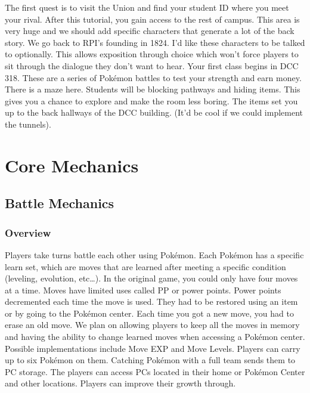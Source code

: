 \documentclass[11pt,fleqn]{book} %
\begin{document}
\indent The first quest is to visit the Union and find your student ID where you meet your rival. After this tutorial, you gain access to the rest of campus. This area is very huge and we should add specific characters that generate a lot of the back story. We go back to RPI’s founding in 1824. I’d like these characters to be talked to optionally. This allows exposition through choice which won’t force players to sit through the dialogue they don’t want to hear. Your first class begins in DCC 318. These are a series of Pokémon battles to test your strength and earn money. There is a maze here. Students will be blocking pathways and hiding items. This gives you a chance to explore and make the room less boring. The items set you up to the back hallways of the DCC building. (It’d be cool if we could implement the tunnels).

\newpage



\chapter{Core Mechanics}



\section{Battle Mechanics}

\vspace{1em}
\subsection{Overview}
Players take turns battle each other using Pokémon. Each Pokémon has a specific learn set, which are moves that are learned after meeting a specific condition (leveling, evolution, etc…). In the original game, you could only have four moves at a time. Moves have limited uses called PP or power points. Power points decremented each time the move is used. They had to be restored using an item or by going to the Pokémon center. 
Each time you got a new move, you had to erase an old move. We plan on allowing players to keep all the moves in memory and having the ability to change learned moves when accessing a Pokémon center. Possible implementations include Move EXP and Move Levels. Players can carry up to six Pokémon on them. Catching Pokémon with a full team sends them to PC storage. The players can access PCs located in their home or Pokémon Center and other locations. Players can improve their growth through.
\end{document}
